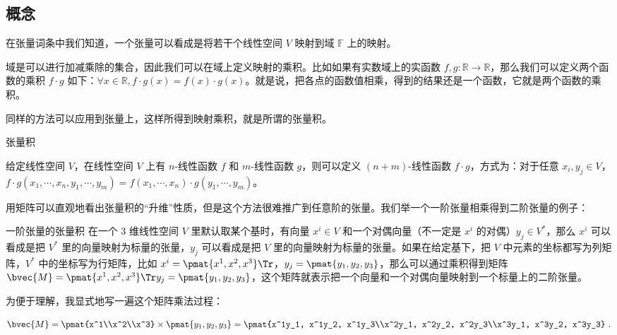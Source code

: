 
\begin{issues}
\end{issues}



\subsection{概念}
在张量词条中我们知道，一个张量可以看成是将若干个线性空间 $V$ 映射到域 $\mathbb{F}$ 上的映射。

域是可以进行加减乘除的集合，因此我们可以在域上定义映射的乘积。比如如果有实数域上的实函数 $f, g:\mathbb{R} \rightarrow \mathbb{R}$，那么我们可以定义两个函数的乘积 $f \cdot g$ 如下：$\forall x \in \mathbb{R}, f \cdot g(x) = f(x) \cdot g(x)$。就是说，把各点的函数值相乘，得到的结果还是一个函数，它就是两个函数的乘积。

同样的方法可以应用到张量上，这样所得到映射乘积，就是所谓的张量积。

\begin{definition}{张量积}\label{TsrPrd_def1}

给定线性空间 $V$，在线性空间 $V$ 上有 $n$-线性函数 $f$ 和 $m$-线性函数 $g$，则可以定义 $(n+m)$-线性函数 $f\cdot g$，方式为：对于任意 $x_i, y_j\in V$，$f\cdot g(x_1, \cdots, x_n, y_1, \cdots, y_m)=f(x_1, \cdots, x_n)\cdot g(y_1, \cdots, y_m)$。

\end{definition}

用矩阵可以直观地看出张量积的“升维”性质，但是这个方法很难推广到任意阶的张量。我们举一个一阶张量相乘得到二阶张量的例子：

\begin{example}{一阶张量的张量积}
在一个 $3$ 维线性空间 $V$ 里默认取某个基时，有向量 $x^i\in V$ 和一个对偶向量（不一定是 $x^i$ 的对偶）$y_j\in V^*$，那么 $x^i$ 可以看成是把 $V^*$ 里的向量映射为标量的张量，$y_j$ 可以看成是把 $V$ 里的向量映射为标量的张量。如果在给定基下，把 $V$ 中元素的坐标都写为列矩阵，$V^*$ 中的坐标写为行矩阵，比如 $x^i=\pmat{x^1, x^2, x^3}\Tr$，$y_j=\pmat{y_1, y_2, y_3}$，那么可以通过乘积得到矩阵 $\bvec{M}=\pmat{x^1, x^2, x^3}\Tr y_j=\pmat{y_1, y_2, y_3}$，这个矩阵就表示把一个向量和一个对偶向量映射到一个标量上的二阶张量。

为便于理解，我显式地写一遍这个矩阵乘法过程：

\begin{equation}
\bvec{M}=\pmat{x^1\\x^2\\x^3}\times\pmat{y_1, y_2, y_3}=\pmat{x^1y_1, x^1y_2, x^1y_3\\x^2y_1, x^2y_2, x^2y_3\\x^3y_1, x^3y_2, x^3y_3}~.
\end{equation}
\end{example}

